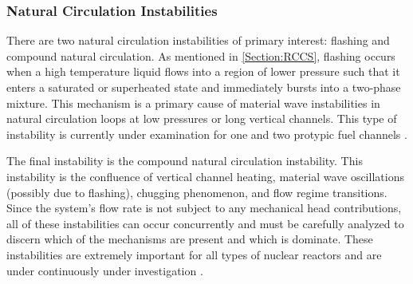 \subsubsection{Natural Circulation Instabilities}
There are two natural circulation instabilities of primary interest: flashing and compound natural circulation.
As mentioned in \cref{Section:RCCS}, flashing occurs when a high temperature liquid flows into a region of lower pressure such that it enters a saturated or superheated state and immediately bursts into a two-phase mixture.
This mechanism is a primary cause of material wave instabilities in natural circulation loops at low pressures or long vertical channels.
This type of instability is currently under examination for one and two protypic fuel channels \cite{marcel_experimental_2009,marcel_experimental_2010}.

The final instability is the compound natural circulation instability.
This instability is the confluence of vertical channel heating, material wave oscillations (possibly due to flashing), chugging phenomenon, and flow regime transitions.
Since the system's flow rate is not subject to any mechanical head contributions, all of these instabilities can occur concurrently and must be carefully analyzed to discern which of the mechanisms are present and which is dominate.
These instabilities are extremely important for all types of nuclear reactors and are under continuously under investigation \cite{dauria_characterization_1990,aritomi_fundamental_1992,yun_twophase_2005}.

